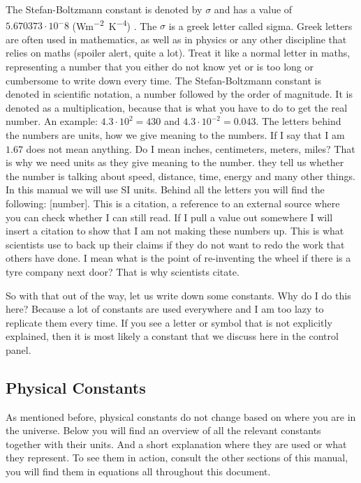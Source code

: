 The Stefan-Boltzmann constant is denoted by $\sigma$ and has a value of $5.670373 \cdot 10^-8$ (\si{Wm^{-2}K^{-4}}) \cite{stefan-boltzmann}. The $\sigma$ is a greek letter called sigma. Greek 
letters are often used in mathematics, as well as in physics or any other discipline that relies on maths (spoiler alert, quite a lot). Treat it like a normal letter in maths, representing a 
number that you either do not know yet or is too long or cumbersome to write down every time. The Stefan-Boltzmann constant is denoted in scientific notation, a number followed by the order of 
magnitude. It is denoted as a multiplication, because that is what you have to do to get the real number. An example: $4.3 \cdot 10^2 = 430$ and $4.3 \cdot 10^{-2} = 0.043$. The
letters behind the numbers are units, how we give meaning to the numbers. If I say that I am $1.67$ does not mean anything. Do I mean inches, centimeters, meters, miles? That is why we need units
as they give meaning to the number. they tell us whether the number is talking about speed, distance, time, energy and many other things. In this manual we will use SI units. Behind all the
letters you will find the following: [number]. This is a citation, a reference to an external source where you can check whether I can still read. If I pull a value out somewhere I will insert a 
citation to show that I am not making these numbers up. This is what scientists use to back up their claims if they do not want to redo the work that others have done. I mean what is the point 
of re-inventing the wheel if there is a tyre company next door? That is why scientists citate.

So with that out of the way, let us write down some constants. Why do I do this here? Because a lot of constants are used everywhere and I am too lazy to replicate them every time. If you see a 
letter or symbol that is not explicitly explained, then it is most likely a constant that we discuss here in the control panel. 

\subsection{Physical Constants}
As mentioned before, physical constants do not change based on where you are in the universe. Below you will find an overview of all the relevant constants together with their units. And a short
explanation where they are used or what they represent. To see them in action, consult the other sections of this manual, you will find them in equations all throughout this document.


